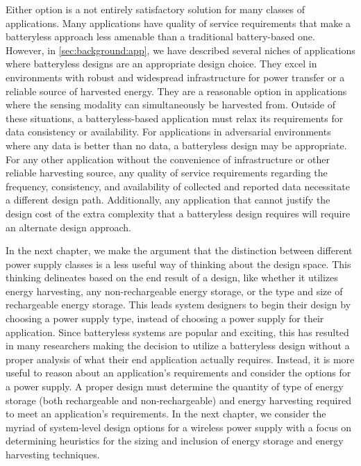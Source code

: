 Either option is a not entirely satisfactory solution for many classes of applications.
Many applications have quality of service requirements that make a batteryless approach less amenable than a traditional battery-based one.
However, in \cref{sec:background:app}, we have described several niches of applications where batteryless designs are an appropriate design choice.
They excel in environments with robust and widespread infrastructure for power transfer or a reliable source of harvested energy. They are a reasonable option in applications where the sensing modality can simultaneously be harvested from.
Outside of these situations, a batteryless-based application must relax its requirements for data consistency or availability. For applications in adversarial environments where any data is better than no data, a batteryless design may be appropriate.
For any other application without the convenience of infrastructure or other reliable harvesting source, any quality of service requirements regarding the frequency, consistency, and availability of collected and reported data necessitate a different design path.
Additionally, any application that cannot justify the design cost of the extra complexity that a batteryless design requires will require an alternate design approach. 

In the next chapter, we make the argument that
the distinction between different power supply classes is a less useful way of thinking about the design space.
This thinking delineates based on the end result of a design, like whether it utilizes energy harvesting, any non-rechargeable energy storage, or the type and size of rechargeable energy storage.
This leads system designers to begin their design by choosing a power supply type, instead of choosing a power supply for their application.
Since batteryless systems are popular and exciting, this has resulted in many researchers making the decision to utilize a batteryless design without a proper analysis of what their end application actually requires.
Instead, it is more useful to reason about an application's requirements and consider the options for a power supply. A proper design must determine the quantity of type of energy storage (both rechargeable and non-rechargeable) and energy harvesting required to meet an application's requirements.
In the next chapter, we consider the myriad of system-level design options for a wireless power supply with a focus on determining heuristics for the sizing and inclusion of energy storage and energy harvesting techniques.

